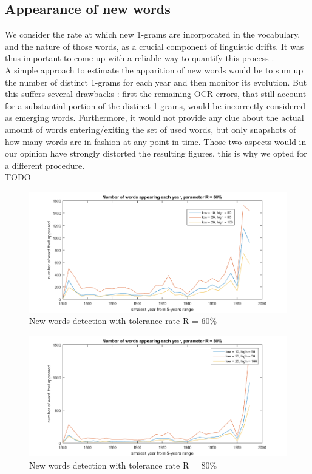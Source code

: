\subsection{Appearance of new words}

We consider the rate at which new 1-grams are incorporated in the vocabulary, and the nature of those words,  as a crucial component of linguistic drifts. It was thus important to come up with a reliable way to quantify this process .\\

A simple approach to estimate the apparition of new words would be to sum up the number of distinct 1-grams for each year and then monitor its evolution. But this suffers several drawbacks : first the remaining OCR errors, that still account for a substantial portion of the distinct 1-grams,  would be incorrectly considered as emerging words.  Furthermore, it would not provide any clue about the actual amount of words entering/exiting the set of used words, but only snapshots of how many words are in fashion at any point in time. Those two aspects would in our opinion have strongly distorted the resulting figures, this is why we opted for a different procedure.\\

TODO \\

\begin{figure}[h!]
        \includegraphics[scale=0.65]{Pictures/statistics/appearing-words/word-appearing-ratio60.png}
        \caption{New words detection with tolerance rate R = 60\%}
        \label{ratio60}
\end{figure}
\begin{figure}[h!]
        \includegraphics[scale=0.65]{Pictures/statistics/appearing-words/word-appearing-ratio80.png}
        \caption{New words detection with tolerance rate R = 80\%}
        \label{ratio80}
\end{figure}